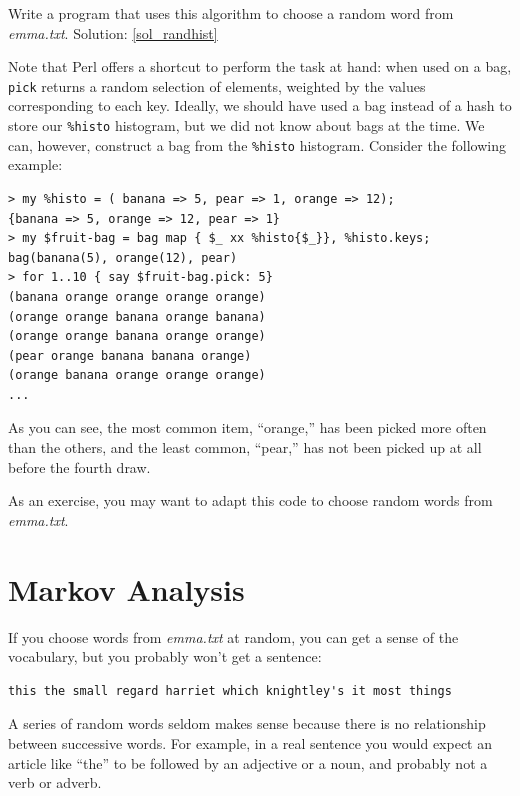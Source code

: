 \begin{exercise}
\label{randhist}

Write a program that uses this algorithm to choose a random 
word from \emph{emma.txt}.  
Solution: \ref{sol_randhist}
\end{exercise}

Note that Perl offers a shortcut to perform the task 
at hand: when used on a bag, {\tt pick} returns a random 
selection of elements, weighted by the values corresponding 
to each key. Ideally, we should have used a bag instead of 
a hash to store our \verb'%histo' histogram, but we did not 
know about bags at the time. We can, however, construct a 
bag from the \verb'%histo' histogram. Consider the following 
example:

\begin{verbatim}
> my %histo = ( banana => 5, pear => 1, orange => 12);
{banana => 5, orange => 12, pear => 1}
> my $fruit-bag = bag map { $_ xx %histo{$_}}, %histo.keys;
bag(banana(5), orange(12), pear)
> for 1..10 { say $fruit-bag.pick: 5}
(banana orange orange orange orange)
(orange orange banana orange banana)
(orange orange banana orange orange)
(pear orange banana banana orange)
(orange banana orange orange orange)
...
\end{verbatim}

As you can see, the most common item, ``orange,'' has been 
picked more often than the others, and the least common, 
``pear,'' has not been picked up at all before the fourth 
draw. 

As an exercise, you may want to adapt this code to 
choose random words from \emph{emma.txt}.



\section{Markov Analysis}
\label{markov}

If you choose words from \emph{emma.txt} at random, you can get a
sense of the vocabulary, but you probably won't get a sentence:

\begin{verbatim}
this the small regard harriet which knightley's it most things
\end{verbatim}
%
A series of random words seldom makes sense because there
is no relationship between successive words.  For example, in
a real sentence you would expect an article like ``the'' to
be followed by an adjective or a noun, and probably not a verb
or adverb.

